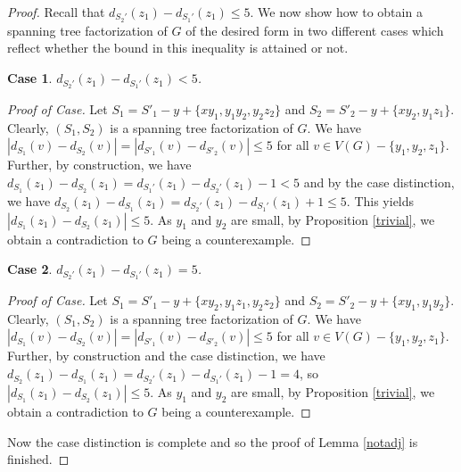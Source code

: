 \documentclass{article}
\theoremstyle{plain}
\newtheorem{case}{Case}
\theoremstyle{nonumberplain}
\theoremstyle{nonumberplain}
\newcommand{\stf}{spanning tree factorization }
\begin{document}
\begin{proof}
 Recall that $d_{S_2'}(z_1)-d_{S_1'}(z_1) \leq 5$. We now show how to obtain a \stf of $G$ of the desired form in two different cases which reflect whether the bound in this inequality is attained or not.
\setcounter{case}{0}
\begin{case}
$d_{S_2'}(z_1)-d_{S_1'}(z_1)<5$.
\end{case}
\begin{proof}[Proof of Case]
Let $S_1=S'_1-y+\{xy_1,y_1y_2,y_2z_2\}$ and $S_2=S'_2-y+\{xy_2,y_1z_1\}$.  Clearly, $(S_1,S_2)$ is a \stf of $G$. We have $|d_{S_1}(v)-d_{S_2}(v)|=|d_{S'_1}(v)-d_{S'_2}(v)|\leq 5$ for all $v \in V(G)-\{y_1,y_2,z_1\}$. Further, by construction, we have $d_{S_1}(z_1)-d_{S_2}(z_1)=d_{S_1'}(z_1)-d_{S_2'}(z_1)-1<5$ and by the case distinction, we have $d_{S_2}(z_1)-d_{S_1}(z_1)=d_{S_2'}(z_1)-d_{S_1'}(z_1)+1\leq 5$. This yields $|d_{S_1}(z_1)-d_{S_2}(z_1)|\leq 5$. As $y_1$ and $y_2$ are small, by Proposition \ref{trivial}, we obtain a contradiction to $G$ being a counterexample.
\renewcommand{\qedsymbol}{$\blacksquare$}
\end{proof}
\begin{case}
$d_{S_2'}(z_1)-d_{S_1'}(z_1)=5$. 
\end{case}
\begin{proof}[Proof of Case]
Let $S_1=S'_1-y+\{xy_2,y_1z_1,y_2z_2\}$ and $S_2=S'_2-y+\{xy_1,y_1y_2\}$.  Clearly, $(S_1,S_2)$ is a \stf of $G$. We have $|d_{S_1}(v)-d_{S_2}(v)|=|d_{S'_1}(v)-d_{S'_2}(v)|\leq 5$ for all $v \in V(G)-\{y_1,y_2,z_1\}$. Further, by construction and the case distinction, we have $d_{S_2}(z_1)-d_{S_1}(z_1)=d_{S_2'}(z_1)-d_{S_1'}(z_1)-1=4$, so $|d_{S_1}(z_1)-d_{S_2}(z_1)|\leq 5$. As $y_1$ and $y_2$ are small, by Proposition \ref{trivial}, we obtain a contradiction to $G$ being a counterexample.
\renewcommand{\qedsymbol}{$\blacksquare$}
\end{proof}
Now the case distinction is complete and so the proof of Lemma \ref{notadj} is finished.
\end{proof}
\end{document}
